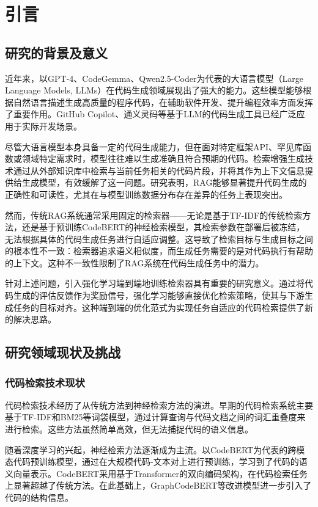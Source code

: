 \documentclass[
    fontset = win, %
  ]{njuthesis}
\begin{document}
\chapter{引言}

\section{研究的背景及意义}

近年来，以GPT-4\cite{gpt42023}、CodeGemma、Qwen2.5-Coder\cite{qwen25coder2024}为代表的大语言模型（Large Language Models, LLMs）在代码生成领域展现出了强大的能力。这些模型能够根据自然语言描述生成高质量的程序代码，在辅助软件开发、提升编程效率方面发挥了重要作用。GitHub Copilot、通义灵码等基于LLM的代码生成工具已经广泛应用于实际开发场景。

尽管大语言模型本身具备一定的代码生成能力，但在面对特定框架API、罕见库函数或领域特定需求时，模型往往难以生成准确且符合预期的代码。检索增强生成技术通过从外部知识库中检索与当前任务相关的代码片段，并将其作为上下文信息提供给生成模型，有效缓解了这一问题。研究表明，RAG能够显著提升代码生成的正确性和可读性，尤其在与模型训练数据分布存在差异的任务上表现突出。

然而，传统RAG系统通常采用固定的检索器——无论是基于TF-IDF的传统检索方法，还是基于预训练CodeBERT的神经检索模型，其检索参数在部署后被冻结，无法根据具体的代码生成任务进行自适应调整。这导致了检索目标与生成目标之间的根本性不一致：检索器追求语义相似度，而生成任务需要的是对代码执行有帮助的上下文。这种不一致性限制了RAG系统在代码生成任务中的潜力。

针对上述问题，引入强化学习端到端地训练检索器具有重要的研究意义。通过将代码生成的评估反馈作为奖励信号，强化学习能够直接优化检索策略，使其与下游生成任务的目标对齐。这种端到端的优化范式为实现任务自适应的代码检索提供了新的解决思路。

\section{研究领域现状及挑战}

\subsection{代码检索技术现状}

代码检索技术经历了从传统方法到神经检索方法的演进。早期的代码检索系统主要基于TF-IDF和BM25等词袋模型，通过计算查询与代码文档之间的词汇重叠度来进行检索。这些方法虽然简单高效，但无法捕捉代码的语义信息。

随着深度学习的兴起，神经检索方法逐渐成为主流。以CodeBERT\cite{codebert2020}为代表的跨模态代码预训练模型，通过在大规模代码-文本对上进行预训练，学习到了代码的语义向量表示。CodeBERT采用基于Transformer的双向编码架构，在代码检索任务上显著超越了传统方法。在此基础上，GraphCodeBERT\cite{graphcodebert2021}等改进模型进一步引入了代码的结构信息。
\end{document}
